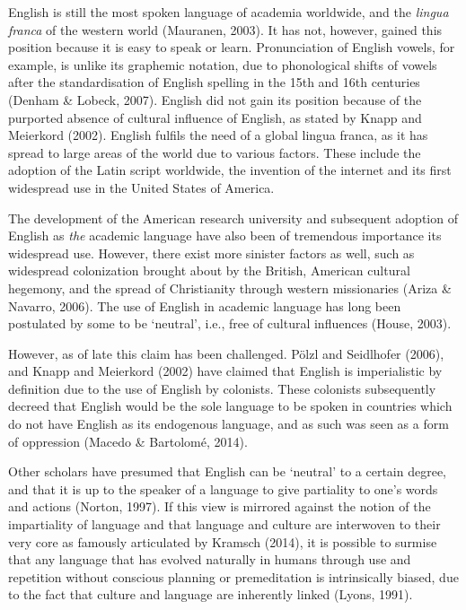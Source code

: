 English is still the most spoken language of academia worldwide, and the \textit{lingua franca} of the western world (Mauranen, 2003). It has not, however, gained this position because it is easy to speak or learn. Pronunciation of English vowels, for example, is unlike its graphemic notation, due to phonological shifts of vowels after the standardisation of English spelling in the 15th and 16th centuries (Denham \& Lobeck, 2007). English did not gain its position because of the purported absence of cultural influence of English, as stated by Knapp and Meierkord (2002). English fulfils the need of a global lingua franca, as it has spread to large areas of the world due to various factors. These include the adoption of the Latin script worldwide, the invention of the internet and its first widespread use in the United States of America. 

The development of the American research university and subsequent adoption of English as \textit{the} academic language have also been of tremendous importance its widespread use. However, there exist more sinister factors as well, such as widespread colonization brought about by the British, American cultural hegemony, and the spread of Christianity through western missionaries (Ariza \& Navarro, 2006). The use of English in academic language has long been postulated by some to be ‘neutral’, i.e., free of cultural influences (House, 2003). 

However, as of late this claim has been challenged. Pölzl and Seidlhofer (2006), and Knapp and Meierkord (2002) have claimed that English is imperialistic by definition due to the use of English by colonists. These colonists subsequently decreed that English would be the sole language to be spoken in countries which do not have English as its endogenous language, and as such was seen as a form of oppression (Macedo \& Bartolomé, 2014).

Other scholars have presumed that English can be ‘neutral’ to a certain degree, and that it is up to the speaker of a language to give partiality to one’s words and actions (Norton, 1997). If this view is mirrored against the notion of the impartiality of language and that language and culture are interwoven to their very core as famously articulated by Kramsch (2014), it is possible to surmise that any language that has evolved naturally in humans through use and repetition without conscious planning or premeditation is intrinsically biased, due to the fact that culture and language are inherently linked (Lyons, 1991). 

